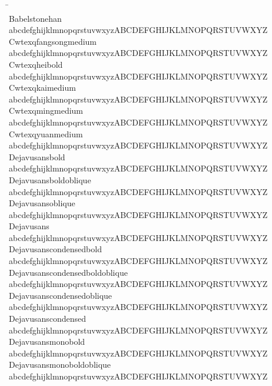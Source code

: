 \begin{tabbing}
\phantom{XXXXXXXXXXXXXXXXXXXXXXXXX} \= \phantom{XXXXXXXXXXXXXXXXXXXXXXXXXXXXXXXXXXXXXXXXXXXXXXXXXXXXXXXXXXXX} \\
Babelstonehan \> {\mktsFontfileBabelstonehan{}abcdefghijklmnopqrstuvwxyzABCDEFGHIJKLMNOPQRSTUVWXYZ} \\
Cwtexqfangsongmedium \> {\mktsFontfileCwtexqfangsongmedium{}abcdefghijklmnopqrstuvwxyzABCDEFGHIJKLMNOPQRSTUVWXYZ} \\
Cwtexqheibold \> {\mktsFontfileCwtexqheibold{}abcdefghijklmnopqrstuvwxyzABCDEFGHIJKLMNOPQRSTUVWXYZ} \\
Cwtexqkaimedium \> {\mktsFontfileCwtexqkaimedium{}abcdefghijklmnopqrstuvwxyzABCDEFGHIJKLMNOPQRSTUVWXYZ} \\
Cwtexqmingmedium \> {\mktsFontfileCwtexqmingmedium{}abcdefghijklmnopqrstuvwxyzABCDEFGHIJKLMNOPQRSTUVWXYZ} \\
Cwtexqyuanmedium \> {\mktsFontfileCwtexqyuanmedium{}abcdefghijklmnopqrstuvwxyzABCDEFGHIJKLMNOPQRSTUVWXYZ} \\
Dejavusansbold \> {\mktsFontfileDejavusansbold{}abcdefghijklmnopqrstuvwxyzABCDEFGHIJKLMNOPQRSTUVWXYZ} \\
Dejavusansboldoblique \> {\mktsFontfileDejavusansboldoblique{}abcdefghijklmnopqrstuvwxyzABCDEFGHIJKLMNOPQRSTUVWXYZ} \\
Dejavusansoblique \> {\mktsFontfileDejavusansoblique{}abcdefghijklmnopqrstuvwxyzABCDEFGHIJKLMNOPQRSTUVWXYZ} \\
Dejavusans \> {\mktsFontfileDejavusans{}abcdefghijklmnopqrstuvwxyzABCDEFGHIJKLMNOPQRSTUVWXYZ} \\
Dejavusanscondensedbold \> {\mktsFontfileDejavusanscondensedbold{}abcdefghijklmnopqrstuvwxyzABCDEFGHIJKLMNOPQRSTUVWXYZ} \\
Dejavusanscondensedboldoblique \> {\mktsFontfileDejavusanscondensedboldoblique{}abcdefghijklmnopqrstuvwxyzABCDEFGHIJKLMNOPQRSTUVWXYZ} \\
Dejavusanscondensedoblique \> {\mktsFontfileDejavusanscondensedoblique{}abcdefghijklmnopqrstuvwxyzABCDEFGHIJKLMNOPQRSTUVWXYZ} \\
Dejavusanscondensed \> {\mktsFontfileDejavusanscondensed{}abcdefghijklmnopqrstuvwxyzABCDEFGHIJKLMNOPQRSTUVWXYZ} \\
Dejavusansmonobold \> {\mktsFontfileDejavusansmonobold{}abcdefghijklmnopqrstuvwxyzABCDEFGHIJKLMNOPQRSTUVWXYZ} \\
Dejavusansmonoboldoblique \> {\mktsFontfileDejavusansmonoboldoblique{}abcdefghijklmnopqrstuvwxyzABCDEFGHIJKLMNOPQRSTUVWXYZ} \\

\end{tabbing}
